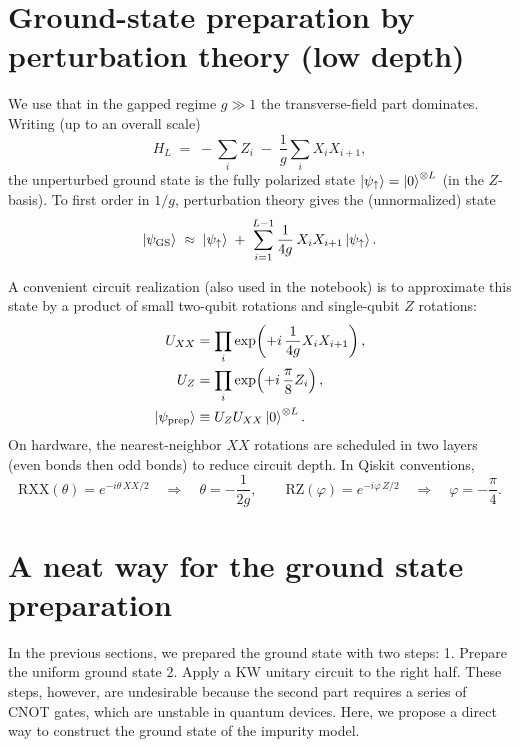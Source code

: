 \documentclass[11pt]{article}
\begin{document}
\section{Ground-state preparation by perturbation theory (low depth)}
We use that in the gapped regime $g\gg 1$ the transverse-field part dominates.
Writing (up to an overall scale)
\begin{equation}
H_L \;=\; -\sum_{i} Z_i \;-\; \frac{1}{g}\sum_{i} X_iX_{i+1},
\end{equation}
the unperturbed ground state is the fully polarized state
$\ket{\psi_{\uparrow}} = \ket{0}^{\otimes L}$ (in the $Z$-basis).
To first order in $1/g$, perturbation theory gives the (unnormalized) state
\begin{equation}\label{eq:GS_uniform}
\ket{\psi_{\mathrm{GS}}} \;\approx\; \ket{\psi_{\uparrow}}
\;+\; \sum_{i=1}^{L-1}\frac{1}{4g}\,X_iX_{i+1}\ket{\psi_{\uparrow}}.
\end{equation}

A convenient circuit realization (also used in the notebook) is to approximate this
state by a product of small two-qubit rotations and single-qubit $Z$ rotations:
\begin{align}
U_{XX} &= \prod_i \exp\!\left(+ i\,\frac{1}{4g} X_iX_{i+1}\right), \\
U_{Z}  &= \prod_i \exp\!\left(+ i\,\frac{\pi}{8} Z_i\right), \\
\ket{\psi_{\mathrm{prep}}} &\equiv U_Z U_{XX}\ket{0}^{\otimes L}.
\end{align}
On hardware, the nearest-neighbor $XX$ rotations are scheduled in two layers (even
bonds then odd bonds) to reduce circuit depth. In Qiskit conventions,
\[
\mathrm{RXX}(\theta)=e^{-i\theta\,XX/2}\quad\Rightarrow\quad
\theta=-\frac{1}{2g},
\qquad
\mathrm{RZ}(\varphi)=e^{-i\varphi\,Z/2}\quad\Rightarrow\quad
\varphi=-\frac{\pi}{4}.
\]


\section{A neat way for the ground state preparation}
In the previous sections, we prepared the ground state with two steps: 1. Prepare the uniform ground state 2. Apply a KW unitary circuit to the right half. These steps, however, are undesirable because the second part requires a series of CNOT gates, which are unstable in quantum devices.
Here, we propose a direct way to construct the ground state of the impurity model.
\end{document}
